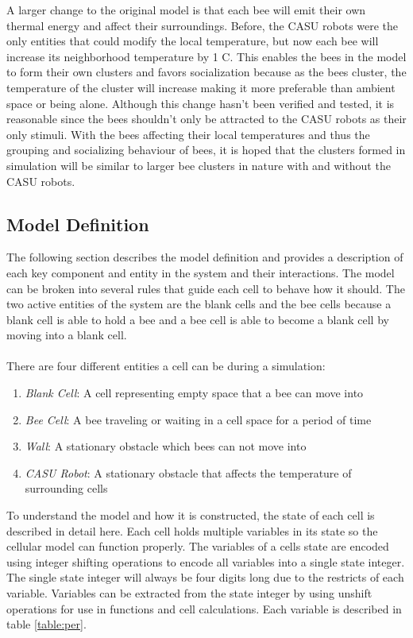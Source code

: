 \documentclass[conference,compsoc,onecolumn]{IEEEtran}
\begin{document}
A larger change to the original model is that each bee will emit their own thermal energy and affect their surroundings. Before, the CASU robots were the only entities that could modify the local temperature, but now each bee will increase its neighborhood temperature by 1 \degree C. This enables the bees in the model to form their own clusters and favors socialization because as the bees cluster, the temperature of the cluster will increase making it more preferable than ambient space or being alone. Although this change hasn't been verified and tested, it is reasonable since the bees shouldn't only be attracted to the CASU robots as their only stimuli. With the bees affecting their local temperatures and thus the grouping and socializing behaviour of bees, it is hoped that the clusters formed in simulation will be similar to larger bee clusters in nature with and without the CASU robots.

\subsection{Model Definition}\label{def}

The following section describes the model definition and provides a description of each key component and entity in the system and their interactions. The model can be broken into several rules that guide each cell to behave how it should. The two active entities of the system are the blank cells and the bee cells because a blank cell is able to hold a bee and a bee cell is able to become a blank cell by moving into a blank cell.
\\
\\
There are four different entities a cell can be during a simulation:
\begin{enumerate}
	\item \emph{Blank Cell}: A cell representing empty space that a bee can move into
	\item \emph{Bee Cell}: A bee traveling or waiting in a cell space for a period of time
	\item \emph{Wall}: A stationary obstacle which bees can not move into
	\item \emph{CASU Robot}: A stationary obstacle that affects the temperature of surrounding cells
\end{enumerate}

To understand the model and how it is constructed, the state of each cell is described in detail here. Each cell holds multiple variables in its state so the cellular model can function properly. The variables of a cells state are encoded using integer shifting operations to encode all variables into a single state integer. The single state integer will always be four digits long due to the restricts of each variable. Variables can be extracted from the state integer by using unshift operations for use in functions and cell calculations. Each variable is described in table \ref{table:per}.
\end{document}
